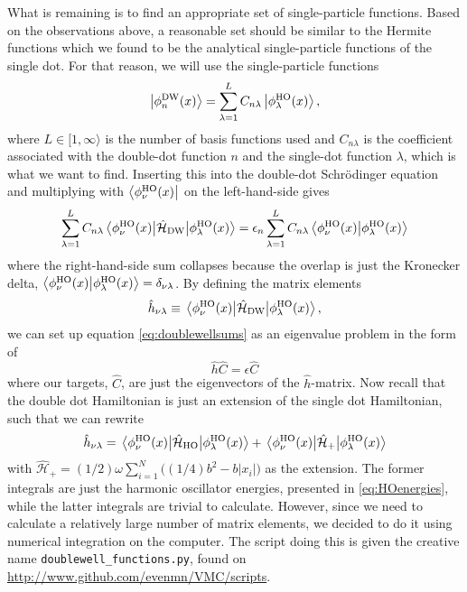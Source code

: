 What is remaining is to find an appropriate set of single-particle functions. Based on the observations above, a reasonable set should be similar to the Hermite functions which we found to be the analytical single-particle functions of the single dot. For that reason, we will use the single-particle functions 
\begin{equation}
\ket{\phi_n^{\text{DW}}(x)}=\sum_{\lambda=1}^{L}C_{n\lambda}\ket{\phi_{\lambda}^{\text{HO}}(x)},
\end{equation}
where $L\in[1,\infty\rangle$ is the number of basis functions used and $C_{n\lambda}$ is the coefficient associated with the double-dot function $n$ and the single-dot function $\lambda$, which is what we want to find. Inserting this into the double-dot Schrödinger equation and multiplying with $\bra{\phi_{\nu}^{\text{HO}}(x)}$ on the left-hand-side gives
\begin{equation}
\label{eq:doublewellsums}
\sum_{\lambda=1}^LC_{n\lambda}\mel{\phi_{\nu}^{\text{HO}}(x)}{\hat{\mathcal{H}}_{\text{DW}}}{\phi_{\lambda}^{\text{HO}}(x)}=\epsilon_n\sum_{\lambda=1}^LC_{n\lambda}\braket{\phi_{\nu}^{\text{HO}}(x)}{\phi_{\lambda}^{\text{HO}}(x)}
\end{equation}
where the right-hand-side sum collapses because the overlap is just the Kronecker delta, $\braket{\phi_{\nu}^{\text{HO}}(x)}{\phi_{\lambda}^{\text{HO}}(x)}=\delta_{\nu\lambda}$. By defining the matrix elements
\begin{equation}
\hat{h}_{\nu\lambda}\equiv\mel{\phi_{\nu}^{\text{HO}}(x)}{\hat{\mathcal{H}}_{\text{DW}}}{\phi_{\lambda}^{\text{HO}}(x)},
\end{equation}
we can set up equation \eqref{eq:doublewellsums} as an eigenvalue problem in the form of
\begin{equation}
\hat{h}\hat{C}=\epsilon\hat{C}
\end{equation}
where our targets, $\hat{C}$, are just the eigenvectors of the $\hat{h}$-matrix. Now recall that the double dot Hamiltonian is just an extension of the single dot Hamiltonian, such that we can rewrite
\begin{equation}
\hat{h}_{\nu\lambda}=\mel{\phi_{\nu}^{\text{HO}}(x)}{\hat{\mathcal{H}}_{\text{HO}}}{\phi_{\lambda}^{\text{HO}}(x)}+\mel{\phi_{\nu}^{\text{HO}}(x)}{\hat{\mathcal{H}}_{\text{+}}}{\phi_{\lambda}^{\text{HO}}(x)}
\end{equation}
with $\hat{\mathcal{H}}_{\text{+}}=(1/2)\omega\sum_{i=1}^N\Big((1/4)b^2-b|x_i|\Big)$ as the extension. The former integrals are just the harmonic oscillator energies, presented in \eqref{eq:HOenergies}, while the latter integrals are trivial to calculate. However, since we need to calculate a relatively large number of matrix elements, we decided to do it using numerical integration on the computer. The script doing this is given the creative name \lstinline|doublewell_functions.py|, found on \url{http://www.github.com/evenmn/VMC/scripts}.


